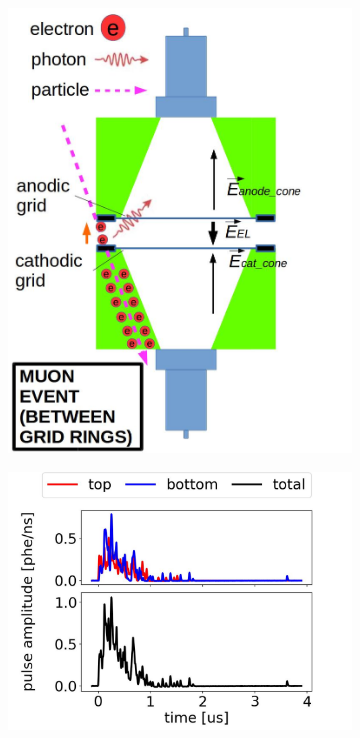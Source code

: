 \begin{figure}[!htbp]
	\centering
	\begin{subfigure}[b]{.8\textwidth}
		\centering
		\includegraphics[width=\halfwidth,clip,trim={0 0 0 0},angle=0,origin=c]{Figures/GasTest/WeiDrawEvent/MuonEventRing.jpg}
		\caption{}
		\label{fig:muon ring a}
	\end{subfigure}
	\par\bigskip
	\begin{subfigure}[b]{0.7\textwidth}
		\centering
		\includegraphics[width=\figurewidth,clip,trim={0 0 0 0}]{Figures/GasTest/exampleWaveforms/proc64767id00000003.jpg}%

\end{subfigure}
\end{figure}
